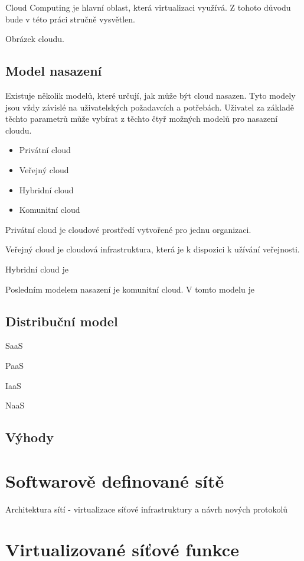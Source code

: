 Cloud Computing je hlavní oblast, která virtualizaci využívá. Z tohoto důvodu bude v této práci stručně vysvětlen. 

Obrázek cloudu.


\subsection{Model nasazení}

Existuje několik modelů, které určují, jak může být cloud nasazen. Tyto modely jsou vždy závislé na uživatelských požadavcích a potřebách. Uživatel za základě těchto parametrů může vybírat z těchto čtyř možných modelů pro nasazení cloudu.
\begin{itemize}
\item Privátní cloud
\item Veřejný cloud
\item Hybridní cloud
\item Komunitní cloud
\end{itemize}

Privátní cloud je cloudové prostředí vytvořené pro jednu organizaci. 

Veřejný cloud je cloudová infrastruktura, která je k dispozici k užívání veřejnosti. 

Hybridní cloud je 

Posledním modelem nasazení je komunitní cloud. V tomto modelu je 

\subsection{Distribuční model}

SaaS

PaaS

IaaS

NaaS

\subsection{Výhody}

\section{Softwarově definované sítě}\label{sub:interaction}

Architektura sítí - virtualizace síťové infrastruktury a návrh nových protokolů

\section{Virtualizované síťové funkce}\label{sub:interaction}

